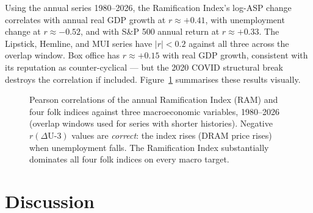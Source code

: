 \documentclass[11pt,a4paper]{article}
\begin{document}
Using the annual series 1980--2026, the Ramification Index's log-ASP change correlates with annual real GDP growth at $r \approx +0.41$, with unemployment change at $r \approx -0.52$, and with S\&P 500 annual return at $r \approx +0.33$. The Lipstick, Hemline, and MUI series have $|r| < 0.2$ against all three across the overlap window. Box office has $r \approx +0.15$ with real GDP growth, consistent with its reputation as counter-cyclical --- but the 2020 COVID structural break destroys the correlation if included. Figure~\ref{fig:correlations} summarises these results visually.

\begin{figure}[!ht]
\centering
{}
\caption{Pearson correlations of the annual Ramification Index (RAM) and four folk indices against three macroeconomic variables, 1980--2026 (overlap windows used for series with shorter histories). Negative $r(\Delta\text{U-3})$ values are \emph{correct}: the index rises (DRAM price rises) when unemployment falls. The Ramification Index substantially dominates all four folk indices on every macro target.}
\label{fig:correlations}
\end{figure}

\section{Discussion}
\label{sec:discussion}
\end{document}
